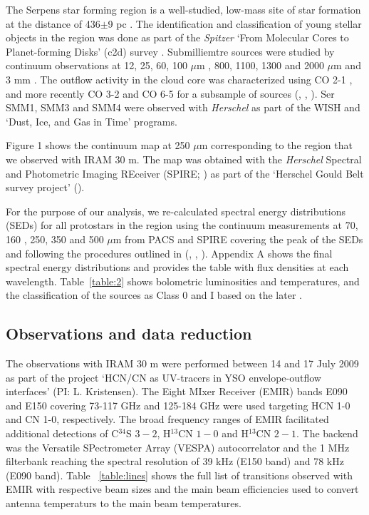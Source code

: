 \documentclass{aa}
\begin{document}
The Serpens star forming region is a well-studied, low-mass site of star formation at the 
distance of 436$\pm$9 pc \citep{Ort17}. The identification and classification of young 
stellar objects in the region was done as part of the \textit{Spitzer} ‘From Molecular Cores to
Planet-forming Disks’ (c2d) survey \citep{Har07,Eno09,Eva09,Dun15}. 
Submilliemtre sources were studied by continuum observations at 12, 25, 60, 100 $\mu$m \citep{Hur96}, 800, 1100, 1300 and 2000 $\mu$m \citep{Cas93} and 3 mm \citep{Tes98}. The outflow activity in the cloud core was characterized using CO 2-1 \citep{Dav99}, and 
more recently CO 3-2 and CO 6-5 for a subsample of sources (\citealt{Gra10}, \citealt{Dio10}, \citealt{Yil15}). Ser SMM1, SMM3 and 
SMM4 were observed with \textit{Herschel} as part of the WISH and `Dust, Ice, and Gas in Time' 
\citep[DIGIT,][]{Gre13,Gre16,YL18} programs. 

Figure 1 shows the continuum map at 250 $\mu$m corresponding to the region that we observed with 
IRAM 30 m. The map was obtained with the \textit{Herschel} Spectral and Photometric Imaging 
REceiver (SPIRE; \citealt{Gri10}) as part of the ‘Herschel Gould Belt survey project' (\citealt{And10}). 

For the purpose of our analysis, we re-calculated spectral energy distributions (SEDs) for 
all protostars in the region using the continuum measurements at 70, 160 , 250, 350 and 500 $\mu$m 
from PACS and SPIRE covering the peak of the SEDs and following the procedures outlined in (\citep{And10}, \citep{Kir13}, \citep{Kon15}).
Appendix A shows the final spectral energy distributions and provides the table with
flux densities at each wavelength. Table~\ref{table:2} shows bolometric luminosities
and temperatures, and the classification of the sources as 
Class 0 and I based on the later \citep{Eva09}.

\subsection{Observations and data reduction}
 
The observations with IRAM 30 m were performed between 14 and 17 July 2009 as part of the project ‘HCN/CN as UV-tracers in YSO envelope-outflow interfaces’ (PI: L. Kristensen). The Eight MIxer Receiver (EMIR) bands E090 and E150 covering 73-117 GHz and 125-184 GHz were used targeting HCN 1-0 and CN 1-0, respectively. The broad frequency ranges of EMIR facilitated additional detections 
of C$^{34}$S $3-2$, H$^{13}$CN $1-0$ and H$^{13}$CN $2-1$. The
backend was the Versatile SPectrometer Array (VESPA) autocorrelator and the 1 MHz filterbank
reaching the spectral resolution of 39 kHz (E150 band) and 78 kHz (E090 band).
Table ~\ref{table:lines} shows the full list of transitions observed with EMIR with 
respective beam sizes and the main beam efficiencies used to convert antenna temperaturs 
to the main beam temperatures. 
\end{document}
